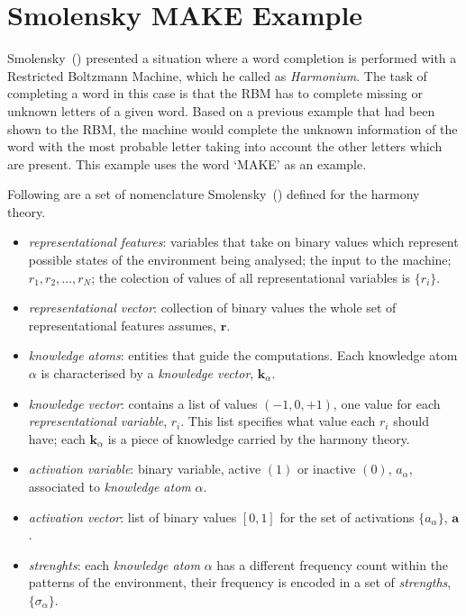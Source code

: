 \section{Smolensky MAKE Example}%
\label{app:smolensky:make}%

Smolensky~(\citeyear{bib:smolensky1986}) presented a situation where a word completion is performed with a Restricted Boltzmann Machine, which he called as \emph{Harmonium}.
The task of completing a word in this case is that the RBM has to complete missing or unknown letters of a given word. 
Based on a previous example that had been shown to the RBM, the machine would complete the unknown information of the word with the most probable letter taking into account the other letters which are present. 
This example uses the word `MAKE' as an example. 

Following are a set of nomenclature Smolensky~(\citeyear{bib:smolensky1986}) defined for the harmony theory. 
\begin{itemize}
    \item \emph{representational features}: variables that take on binary values which represent possible states of the environment being analysed; the input to the machine; $r_{1}, r_{2}, \dots, r_{N}$; the colection of values of all representational variables is $\{r_{i}\}$. 
    \item \emph{representational vector}: collection of binary values the whole set of representational features assumes, $\mathbf{r}$. 
    \item \emph{knowledge atoms}: entities that guide the computations. Each knowledge atom $\alpha$ is characterised by a \emph{knowledge vector}, $\mathbf{k}_{\alpha}$. 
    \item \emph{knowledge vector}: contains a list of values $(-1, 0, +1)$, one value for each \emph{representational variable}, $r_{i}$. This list specifies what value each $r_{i}$ should have; each $\mathbf{k}_{\alpha}$ is a piece of knowledge carried by the harmony theory. 
    \item \emph{activation variable}: binary variable, active $(1)$ or inactive $(0)$, $a_{\alpha}$, associated to \emph{knowledge atom} $\alpha$. 
    \item \emph{activation vector}: list of binary values $[0, 1]$ for the set of activations $\{a_{\alpha}\}$, $\mathbf{a}$. 
    \item \emph{strenghts}: each \emph{knowledge atom} $\alpha$ has a different frequency count within the patterns of the environment, their frequency is encoded in a set of \emph{strengths}, $\{\sigma_{\alpha}\}$. 
\end{itemize}

